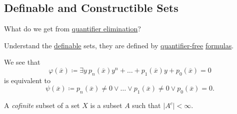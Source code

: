 \subsection{Definable and Constructible Sets}
\begin{problem}
What do we get from \hyperref[def:quantifier-elimination]{quantifier elimination}?
\end{problem}
\begin{answer}
	Understand the \hyperref[def:definable]{definable} sets, they are defined by \hyperref[not:quantifier-free]{quantifier-free} \hyperref[def:formula]{formulas}.
\end{answer}

\begin{remark}
	We see that
	\[
		\varphi (\overline{x} ) \coloneqq \exists y\ p_n(\overline{x} ) y^n + \ldots + p_1(\overline{x} )y + p_0(\overline{x} ) = 0
	\]
	is equivalent to
	\[
		\psi (\overline{x} ) \coloneqq p_n(\overline{x} ) \neq 0 \lor \ldots \lor p_1(\overline{x} ) \neq 0 \lor p_0(\overline{x} ) = 0.
	\]
\end{remark}

\begin{definition}[Cofinite]\label{def:cofinite}
	A \emph{cofinite} subset of a set \(X\) is a subset \(A\) such that \(\vert A^{c} \vert < \infty \).
\end{definition}

